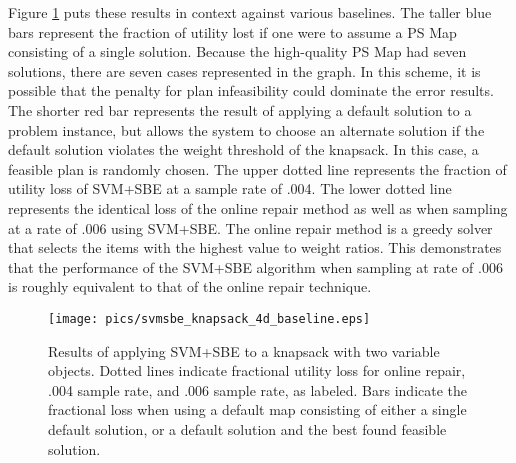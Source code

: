 


Figure \ref{fig:svmsbe_knapsack_4d_baseline} puts these results in context against various baselines.  The taller blue bars represent the fraction of utility lost if one were to assume a PS Map consisting of a single solution.  Because the high-quality PS Map had seven solutions, there are seven cases represented in the graph.  In this scheme, it is possible that the penalty for plan infeasibility could dominate the error results.  The shorter red bar represents the result of applying a default solution to a problem instance, but allows the system to choose an alternate solution if the default solution violates the weight threshold of the knapsack. In this case, a feasible plan is randomly chosen.  The upper dotted line represents the fraction of utility loss of SVM+SBE at a sample rate of .004.  The lower dotted line represents the identical loss of the online repair method as well as when sampling at a rate of .006 using SVM+SBE.  The online repair method is a greedy solver that selects the items with the highest value to weight ratios.  This demonstrates that the performance of the SVM+SBE algorithm when sampling at rate of .006 is roughly equivalent to that of the online repair technique.


\begin{figure}
\begin{center}
\texttt{[image: pics/svmsbe\_knapsack\_4d\_baseline.eps]}
\caption{Results of applying SVM+SBE to a knapsack with two variable objects.  Dotted lines indicate fractional utility loss for online repair, .004 sample rate, and .006 sample rate, as labeled.  Bars indicate the fractional loss when using a default map consisting of either a single default solution, or a default solution and the best found feasible solution.}
\label{fig:svmsbe_knapsack_4d_baseline}
\end{center}
\end{figure}



